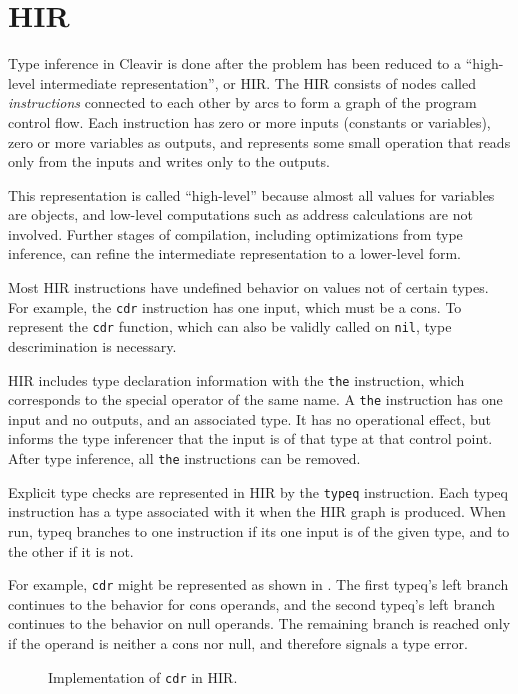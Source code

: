 \section{HIR}
\label{sec-hir}

Type inference in Cleavir is done after the problem has been reduced
to a ``high-level intermediate representation'', or HIR. The HIR
consists of nodes called \textit{instructions} connected to each other
by arcs to form a graph of the program control flow. Each instruction
has zero or more inputs (constants or variables), zero or more
variables as outputs, and represents some small operation that reads
only from the inputs and writes only to the outputs.

This representation is called ``high-level'' because almost all values
for variables are \commonlisp{} objects, and low-level computations
such as address calculations are not involved. Further stages of
compilation, including optimizations from type inference, can refine
the intermediate representation to a lower-level form.

Most HIR instructions have undefined behavior on values not of certain
types. For example, the \texttt{cdr} instruction has one input, which
must be a cons. To represent the \commonlisp{} \texttt{cdr} function,
which can also be validly called on \texttt{nil}, type descrimination
is necessary.

HIR includes type declaration information with the \texttt{the}
instruction, which corresponds to the \commonlisp{} special operator
of the same name. A \texttt{the} instruction has one input and no
outputs, and an associated type. It has no operational effect, but
informs the type inferencer that the input is of that type at that
control point. After type inference, all \texttt{the} instructions can
be removed.

Explicit type checks are represented in HIR by the \texttt{typeq}
instruction. Each typeq instruction has a type associated with it when
the HIR graph is produced. When run, typeq branches to one instruction
if its one input is of the given type, and to the other if it is not.

For example, \texttt{cdr} might be represented as shown in
.  The first typeq's left branch continues to the
behavior for cons operands, and the second typeq's left branch
continues to the behavior on null operands. The remaining branch is
reached only if the operand is neither a cons nor null, and therefore
signals a type error.

\begin{figure}
\begin{center}
\end{center}
\caption{\label{fig-cdr}
Implementation of \texttt{cdr} in HIR.}
\end{figure}
